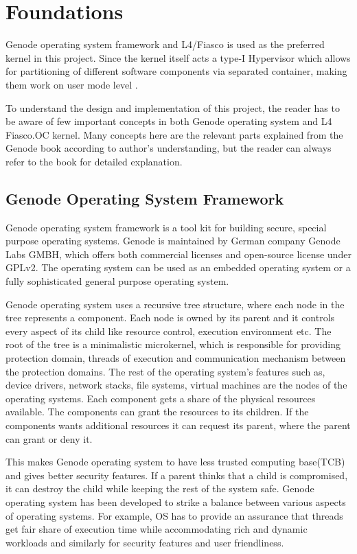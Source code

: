 \chapter{ Foundations} \label{foundations}
Genode operating system framework and L4/Fiasco is used as the preferred kernel in this project. Since the kernel itself acts a type-I Hypervisor which allows for partitioning of different software components via separated container, making them work on user mode level \cite{kia4sm}.

To understand the design and implementation of this project, the reader has to be aware of few important concepts in both Genode operating system and L4 Fiasco.OC kernel. Many concepts here are the relevant parts explained from the Genode book \cite{genodebook} according to author's understanding, but the reader can always refer to the book for detailed explanation.

\section{Genode Operating System Framework} \label{foundations_genode}
Genode operating system  framework is a tool kit for building secure, special purpose operating systems. Genode is maintained by German company Genode Labs GMBH, which  offers both commercial licenses  and open-source license under GPLv2. The operating system can be used as an embedded operating system or a fully sophisticated general purpose operating system. 

Genode operating system uses a recursive tree structure, where each node in the tree represents a component. Each node is owned by its parent and it controls every aspect of its child like resource control, execution environment etc. The root of the tree is a minimalistic microkernel, which is responsible for providing protection domain, threads of execution and communication mechanism between the protection domains. The rest of the operating system's features such as, device drivers, network stacks, file systems, virtual machines are the nodes of the operating systems. Each component gets a share of the physical resources available. The components can grant the resources to its children. If the components wants additional resources it can request its parent, where the parent can grant or deny it.

This makes Genode operating system to have less trusted computing base(TCB) and gives better security features. If a parent thinks that a child is compromised, it can destroy the child while keeping the rest of the system safe. Genode operating system has been developed to strike a balance between various aspects of operating systems. For example, OS has to provide an assurance that threads get fair share of execution time while accommodating rich and dynamic workloads and similarly for security features and user friendliness.

